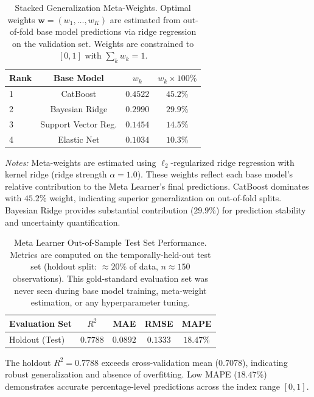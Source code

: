 \begin{table}[!htbp]
\centering
\caption{%
    Stacked Generalization Meta-Weights.
    Optimal weights $\mathbf{w} = (w_1, \ldots, w_K)$ are estimated from out-of-fold base model predictions 
    via ridge regression on the validation set. Weights are constrained to $[0, 1]$ with $\sum_k w_k = 1$.
}
\label{tab:meta_weights}
\small
\begin{tabular}{lccc}
\toprule
\textbf{Rank} & \textbf{Base Model} & $w_k$ & $w_k \times 100\%$ \\
\midrule
1 & CatBoost           & $0.4522$ & $45.2\%$ \\
2 & Bayesian Ridge     & $0.2990$ & $29.9\%$ \\
3 & Support Vector Reg.& $0.1454$ & $14.5\%$ \\
4 & Elastic Net        & $0.1034$ & $10.3\%$ \\
\bottomrule
\end{tabular}
\begin{flushleft}
\footnotesize
\textit{Notes:} 
Meta-weights are estimated using $\ell_2$-regularized ridge regression with kernel ridge (ridge strength $\alpha = 1.0$).
These weights reflect each base model's relative contribution to the Meta Learner's final predictions.
CatBoost dominates with $45.2\%$ weight, indicating superior generalization on out-of-fold splits.
Bayesian Ridge provides substantial contribution ($29.9\%$) for prediction stability and uncertainty quantification.
\end{flushleft}
\end{table}


\begin{table}[!htbp]
\centering
\caption{%
    Meta Learner Out-of-Sample Test Set Performance.
    Metrics are computed on the temporally-held-out test set (holdout split: $\approx 20\%$ of data, $n \approx 150$ observations).
    This gold-standard evaluation set was never seen during base model training, meta-weight estimation, or any hyperparameter tuning.
}
\label{tab:holdout_performance}
\small
\begin{tabular}{lcccc}
\toprule
\textbf{Evaluation Set} & $R^2$ & MAE & RMSE & MAPE \\
\midrule
Holdout (Test)         & $0.7788$ & $0.0892$ & $0.1333$ & $18.47\%$ \\
\bottomrule
\end{tabular}
\begin{flushleft}
\footnotesize
The holdout $R^2 = 0.7788$ exceeds cross-validation mean ($0.7078$), indicating robust generalization and absence of overfitting.
Low MAPE ($18.47\%$) demonstrates accurate percentage-level predictions across the index range $[0, 1]$.
\end{flushleft}
\end{table}


